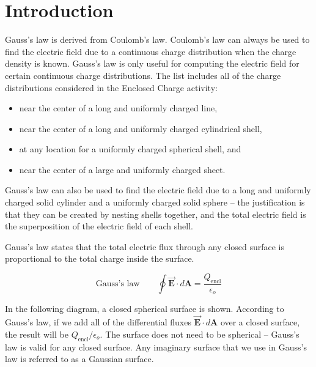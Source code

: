 \documentclass{article}
\newcommand{\bfvec}[1]{\vec{\mathbf{#1}}}
\begin{document}
\section{Introduction}

Gauss's law is derived from Coulomb's law. Coulomb's law can always be used to find the electric field due to a continuous charge distribution when the charge density is known. Gauss's law is only useful for computing the electric field for certain continuous charge distributions. The list includes all of the charge distributions considered in the Enclosed Charge activity:

\begin{itemize}

  \item near the center of a long and uniformly charged line,

  \item near the center of a long and uniformly charged cylindrical shell,

  \item at any location for a uniformly charged spherical shell, and

  \item near the center of a large and uniformly charged sheet.

\end{itemize}

Gauss's law can also be used to find the electric field due to a long and uniformly charged solid cylinder and a uniformly charged solid sphere -- the justification is that they can be created by nesting shells together, and the total electric field is the superposition of the electric field of each shell.

Gauss's law states that the total electric flux through any closed surface is proportional to the total charge inside the surface.

$$\text{Gauss's law}\qquad\oint \bfvec{E}\cdot d\mathbf{A}=\frac{Q_{\text{encl}}}{\epsilon_o}$$

In the following diagram, a closed spherical surface is shown. According to Gauss's law, if we add all of the differential fluxes $\bfvec{E}\cdot d\mathbf{A}$ over a closed surface, the result will be ${Q_{\text{encl}}}/{\epsilon_o}$. The surface does not need to be spherical -- Gauss's law is valid for any closed surface. Any imaginary surface that we use in Gauss's law is referred to as a Gaussian surface.


\end{document}
